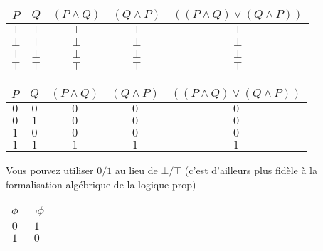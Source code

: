 \begin{frame}

\begin{tabular}{c|c||c|c|c}
$P$ & $Q$ & $(P \wedge Q)$ & $(Q \wedge P)$ & $((P \wedge Q) \vee (Q \wedge P))$ \\\hline
$\bot$ & $\bot$ & $\bot$ & $\bot$ & $\bot$ \\
$\bot$ & $\top$ & $\bot$ & $\bot$ & $\bot$ \\
$\top$ & $\bot$ & $\bot$ & $\bot$ & $\bot$ \\
$\top$ & $\top$ & $\top$ & $\top$ & $\top$ \\
\end{tabular}

\vspace{0.4cm}

\begin{tabular}{c|c||c|c|c}
$P$ & $Q$ & $(P \wedge Q)$ & $(Q \wedge P)$ & $((P \wedge Q) \vee (Q \wedge P))$ \\\hline
$0$ & $0$ & $0$ & $0$ & $0$ \\
$0$ & $1$ & $0$ & $0$ & $0$ \\
$1$ & $0$ & $0$ & $0$ & $0$ \\
$1$ & $1$ & $1$ & $1$ & $1$ \\
\end{tabular}

\vspace{0.4cm}

Vous pouvez utiliser $0/1$ au lieu de $\bot/\top$ (c'est d'ailleurs plus fidèle à la formalisation algébrique de la logique prop)


\end{frame}


\begin{frame}
	
\begin{center}
\pause

\vspace{1cm}

\begin{tabular}{c||c}
$\phi$ & $\neg\phi$ \\\hline
$0$ & $1$\\
$1$ & $0$\\
\end{tabular}
\end{center}
\end{frame}

